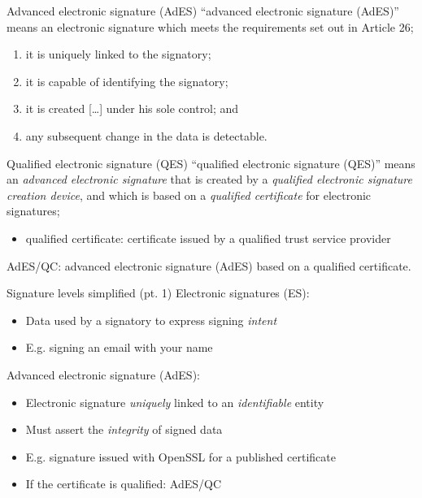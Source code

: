 \begin{frame}{Advanced electronic signature (AdES)}
  \enquote{advanced electronic signature (AdES)} means an electronic signature which meets the requirements set out in Article 26;
  \settowidth{\offset}{26.1}
  \addtolength{\leftmargini}{\offset}
  \begin{enumerate}[<+(1)->]
    \item[(26.a)] it is uniquely linked to the signatory;
    \item[(26.b)] it is capable of identifying the signatory;
    \item[(26.c)] it is created [\dots] under his sole control; and
    \item[(26.d)] [\dots] any subsequent change in the data is detectable.
  \end{enumerate}
\end{frame}

\begin{frame}{Qualified electronic signature (QES)}
  \enquote{qualified electronic signature (QES)} means an \emph{advanced electronic signature} that is created by a \emph{qualified electronic signature creation device}, and which is based on a \emph{qualified certificate} for electronic signatures;
  \begin{itemize}[<+(1)->]
    \item qualified certificate: certificate issued by a qualified trust service provider
  \end{itemize}

  \vfill

  \pause
  AdES/QC: advanced electronic signature (AdES) based on a qualified certificate.
\end{frame}

\begin{frame}{Signature levels simplified (pt. 1)}
  \pause
  Electronic signatures (ES):
  \begin{itemize}[<+(1)->]
    \item Data used by a signatory to express signing \emph{intent}
    \item E.g. signing an email with your name
  \end{itemize}

  \vspace*{1em}

  \pause
  Advanced electronic signature (AdES):
  \begin{itemize}[<+(1)->]
    \item Electronic signature \emph{uniquely} linked to an \emph{identifiable} entity
    \item Must assert the \emph{integrity} of signed data
    \item E.g. signature issued with OpenSSL for a published certificate
    \item If the certificate is qualified: AdES/QC
  \end{itemize}
\end{frame}

